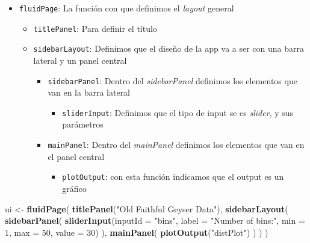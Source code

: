\documentclass[]{book}
\newenvironment{Shaded}{\begin{snugshade}}{\end{snugshade}}
\newcommand{\DataTypeTok}[1]{\textcolor[rgb]{0.13,0.29,0.53}{#1}}
\newcommand{\DecValTok}[1]{\textcolor[rgb]{0.00,0.00,0.81}{#1}}
\newcommand{\KeywordTok}[1]{\textcolor[rgb]{0.13,0.29,0.53}{\textbf{#1}}}
\newcommand{\NormalTok}[1]{#1}
\newcommand{\StringTok}[1]{\textcolor[rgb]{0.31,0.60,0.02}{#1}}
\providecommand{\tightlist}{%
  \setlength{\itemsep}{0pt}\setlength{\parskip}{0pt}}
\begin{document}
\begin{itemize}
\tightlist
\item
  \texttt{fluidPage}: La función con que definimos el \emph{layout} general

  \begin{itemize}
  \tightlist
  \item
    \texttt{titlePanel}: Para definir el título
  \item
    \texttt{sidebarLayout}: Definimos que el diseño de la app va a ser con una barra lateral y un panel central

    \begin{itemize}
    \tightlist
    \item
      \texttt{sidebarPanel}: Dentro del \emph{sidebarPanel} definimos los elementos que van en la barra lateral

      \begin{itemize}
      \tightlist
      \item
        \texttt{sliderInput}: Definimos que el tipo de input se es \emph{slider}, y sus parámetros
      \end{itemize}
    \item
      \texttt{mainPanel}: Dentro del \emph{mainPanel} definimos los elementos que van en el panel central

      \begin{itemize}
      \tightlist
      \item
        \texttt{plotOutput}: con esta función indicamos que el output es un gráfico
      \end{itemize}
    \end{itemize}
  \end{itemize}
\end{itemize}

\begin{Shaded}
\begin{Highlighting}[]
\NormalTok{ui <-}\StringTok{ }\KeywordTok{fluidPage}\NormalTok{(}
    \KeywordTok{titlePanel}\NormalTok{(}\StringTok{"Old Faithful Geyser Data"}\NormalTok{),}
    \KeywordTok{sidebarLayout}\NormalTok{(}
        \KeywordTok{sidebarPanel}\NormalTok{(}
            \KeywordTok{sliderInput}\NormalTok{(}\DataTypeTok{inputId =} \StringTok{"bins"}\NormalTok{,}
                        \DataTypeTok{label =} \StringTok{"Number of bins:"}\NormalTok{,}
                        \DataTypeTok{min =} \DecValTok{1}\NormalTok{,}
                        \DataTypeTok{max =} \DecValTok{50}\NormalTok{,}
                        \DataTypeTok{value =} \DecValTok{30}\NormalTok{)}
\NormalTok{        ),}
        \KeywordTok{mainPanel}\NormalTok{(}
           \KeywordTok{plotOutput}\NormalTok{(}\StringTok{"distPlot"}\NormalTok{)}
\NormalTok{        )}
\NormalTok{    )}
\NormalTok{)}
\end{Highlighting}
\end{Shaded}
\end{document}
